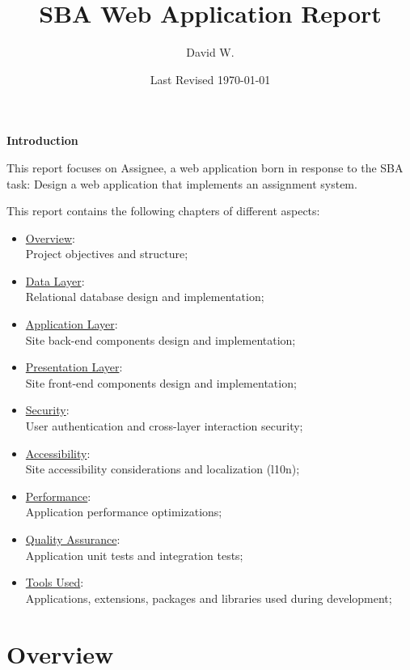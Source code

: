\documentclass[12pt]{report}
\title{SBA Web Application Report}
\author{David W.}
\date{Last Revised \today}
\newcommand{\n}{\par}
\newcommand{\br}{\vspace{1 em}\n}
\begin{document}
\maketitle

\textbf{Introduction}
\br
This report focuses on Assignee, a web application born in response to the SBA task:
Design a web application that implements an assignment system.
\br
This report contains the following chapters of different aspects:
\begin{itemize}
	\item \hyperref[overview]{Overview}:\\
	      Project objectives and structure;
	\item \hyperref[data-layer]{Data Layer}:\\
	      Relational database design and implementation;
	\item \hyperref[application-layer]{Application Layer}:\\
	      Site back-end components design and implementation;
	\item \hyperref[presentation-layer]{Presentation Layer}:\\
	      Site front-end components design and implementation;
	\item \hyperref[security]{Security}:\\
	      User authentication and cross-layer interaction security;
	\item \hyperref[accessibility]{Accessibility}:\\
	      Site accessibility considerations and localization (l10n);
	\item \hyperref[performance]{Performance}:\\
	      Application performance optimizations;
	\item \hyperref[quality-assurance]{Quality Assurance}:\\
	      Application unit tests and integration tests;
	\item \hyperref[tools-used]{Tools Used}:\\
	      Applications, extensions, packages and libraries used during development;
\end{itemize}
\tableofcontents

\chapter{Overview} \label{overview}
\end{document}
